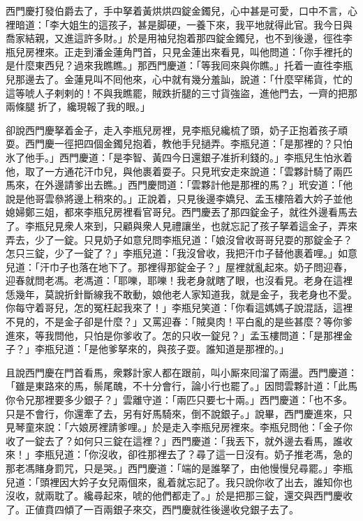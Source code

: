 西門慶打發伯爵去了，手中拏着黃烘烘四錠金鐲兒，心中甚是可愛，口中不言，心裡暗道：「李大姐生的這孩子，甚是脚硬，一養下來，我平地就得此官。我今日與喬家結親，又進這許多財。」於是用袖兒抱着那四錠金鐲兒，也不到後邊，徑徃李瓶兒房裡來。正走到潘金蓮角門首，只見金蓮出來看見，叫他問道：「你手裡托的是什麼東西兒？過來我瞧瞧。」那西門慶道：「等我囘來與你瞧。」托着一直徃李瓶兒那邊去了。{}金蓮見叫不囘他來，心中就有幾分羞訕，說道：「什麼罕稀貨，忙的這等唬人子剌剌的！不與我瞧罷，賊跌折腿的三寸貨強盜，進他門去，一齊的把那兩條腿𢱉折了，纔現報了我的眼。」

卻說西門慶拏着金子，走入李瓶兒房裡，見李瓶兒纔梳了頭，奶子正抱着孩子頑耍。西門慶一徑把四個金鐲兒抱着，教他手兒撾弄。李瓶兒道：「是那裡的？只怕氷了他手。」西門慶道：「是李智、黃四今日還銀子准折利錢的。」李瓶兒生怕氷着他，取了一方通花汗巾兒，與他裹着耍子。只見玳安走來說道：「雲夥計騎了兩匹馬來，在外邊請爹出去瞧。」西門慶問道：「雲夥計他是那裡的馬？」玳安道：「他說是他哥雲叅將邊上稍來的。」正說着，只見後邊李嬌兒、孟玉樓陪着大妗子並他媳婦鄭三姐，都來李瓶兒房裡看官哥兒。西門慶丟了那四錠金子，就徃外邊看馬去了。李瓶兒見衆人來到，只顧與衆人見禮讓坐，也就忘記了孩子拏着這金子，弄來弄去，少了一錠。只見奶子如意兒問李瓶兒道：「娘沒曾收哥哥兒耍的那錠金子？怎只三錠，少了一錠了？」李瓶兒道：「我沒曾收，我把汗巾子替他裹着哩。」如意兒道：「汗巾子也落在地下了。那裡得那錠金子？」屋裡就亂起來。奶子問迎春，迎春就問老馮。老馮道：「耶嚛，耶嚛！我老身就瞎了眼，也沒看見。老身在這裡恁幾年，莫說折針斷線我不敢動，娘他老人家知道我，就是金子，我老身也不愛。你每守着哥兒，怎的冤枉起我來了！」李瓶兒笑道：「你看這媽媽子說混話，這裡不見的，不是金子卻是什麼？」又罵迎春：「賊臭肉！平白亂的是些甚麼？等你爹進來，等我問他，只怕是你爹收了。怎的只收一錠兒？」孟玉樓問道：「是那裡金子？」李瓶兒道：「是他爹拏來的，與孩子耍。誰知道是那裡的。」

且說西門慶在門首看馬，衆夥計家人都在跟前，叫小厮來囘溜了兩盪。西門慶道：「雖是東路來的馬，鬃尾醜，不十分會行，論小行也罷了。」因問雲夥計道：「此馬你令兄那裡要多少銀子？」雲離守道：「兩匹只要七十兩。」西門慶道：「也不多。只是不會行，你還牽了去，另有好馬騎來，倒不說銀子。」說畢，西門慶進來，只見琴童來說：「六娘房裡請爹哩。」於是走入李瓶兒房裡來。李瓶兒問他：「金子你收了一錠去了？如何只三錠在這裡？」西門慶道：「我丟下，就外邊去看馬，誰收來！」李瓶兒道：「你沒收，卻徃那裡去了？尋了這一日沒有。奶子推老馮，急的那老馮賭身罰咒，只是哭。」西門慶道：「端的是誰拏了，由他慢慢兒尋罷。」李瓶兒道：「頭裡因大妗子女兒兩個來，亂着就忘記了。我只說你收了出去，誰知你也沒收，就兩耽了。纔尋起來，唬的他們都走了。」於是把那三錠，還交與西門慶收了。正値賁四傾了一百兩銀子來交，西門慶就徃後邊收兌銀子去了。

